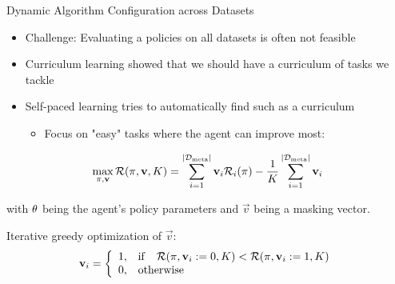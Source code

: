 \begin{frame}[c]{Dynamic Algorithm Configuration across Datasets }
	
\begin{itemize}
	\item Challenge: Evaluating a policies on all datasets is often not feasible
	\pause
	\item Curriculum learning  showed that we should have a curriculum of tasks we tackle
	\pause
	\item Self-paced learning  tries to automatically find such as a curriculum
	\begin{itemize}
		\item Focus on "easy" tasks where the agent can improve most:
	\end{itemize}
\end{itemize}
	
\pause
\begin{equation} 
\label{spl_loss}
\max_{\pi,\mathbf{v}}\mathcal{R}(\pi, \mathbf{v}, K) = \sum^{|\mathcal{D}_{\text{meta}}|}_{i=1} \mathbf{v}_i\mathcal{R}_i(\pi) - \frac{1}{K} \sum^{|\mathcal{D}_{\text{meta}}|}_{i=1} \mathbf{v}_i \nonumber
\end{equation}

with $\theta$ being the agent's policy parameters and $\vec{v}$ being a masking vector.

\pause
\medskip

Iterative greedy optimization of $\vec{v}$:
\begin{equation}
\mathbf{v}_i = \left\{
\begin{array}{ll}
1, &  \mathrm{if}\quad\mathcal{R}(\pi, \mathbf{v}_{i}:=0, K) < \mathcal{R}(\pi, \mathbf{v}_{i}:=1, K)\\
0, & \mathrm{otherwise}
\end{array}
\right.\nonumber
\end{equation}
\end{frame}


